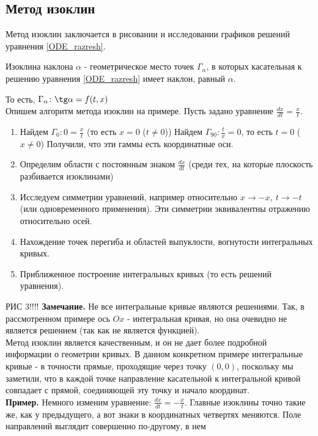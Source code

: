 \subsection{Метод изоклин}
Метод изоклин заключается в рисовании и исследовании графиков решений 
уравнения \ref{ODE_razresh}. 
\begin{defin}
Изоклина наклона $\alpha$ - геометрическое место точек $\Gamma_\alpha$, в 
которых касательная к решению уравнения \ref{ODE_razresh} имеет наклон, равный
$\alpha$.
\end{defin}
То есть, $\Gamma_\alpha\colon \tg\alpha=f(t,x)$\\
Опишем алгоритм метода изоклин на примере. Пусть задано уравнение 
$\frac{dx}{dt}=\frac{x}{t}$. 
\begin{enumerate}
    \item Найдем $\Gamma_0:0=\frac{x}{t}$ (то есть $x=0$ ($t\ne0$))
     Найдем $\Gamma_{90}:\frac{t}{x}=0$, то есть $t=0$ ($x\ne0$) 
    Получили, что эти гаммы есть координатные оси. 
    \item Определим области с постоянным знаком $\frac{dx}{dt}$ (среди тех,
        на которые плоскость разбивается изоклинами) 
    \item Исследуем симметрии уравнений, например относительно 
    $x\to-x,~t\to-t$ (или одновременного применения). Эти симметрии
    эквивалентны отражению относительно осей.
    \item Нахождение точек перегиба и областей выпуклости, вогнутости 
интегральных кривых.  
    \item Приближенное построение интегральных кривых (то есть решений 
        уравнения).
\end{enumerate}
РИС 3!!!!
\textbf{Замечание.} Не все интегральные кривые являются решениями. Так, в 
рассмотренном примере ось $Ox$ - интегральная кривая, но она очевидно не 
является решением (так как не является функцией). \\
Метод изоклин является качественным, и он не дает более подробной информации
о геометрии кривых. В данном конкретном примере интегральные кривые - в 
точности прямые, проходящие через точку $(0,0)$, поскольку мы заметили, что в 
каждой точке направление касательной к интегральной кривой совпадает с прямой, 
соединяющей эту точку и начало координат.\\
\textbf{Пример.} Немного изменим уравнение: $\frac{dx}{dt}=-\frac{x}{t}$. 
Главные изоклины точно такие же, как у предыдущего, а вот знаки в координатных
четвертях меняются. Поле направлений выглядит совершенно по-другому, в нем 
